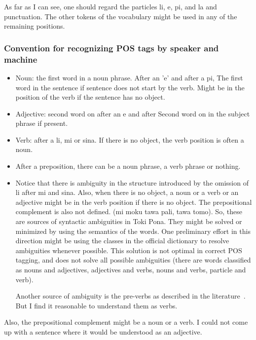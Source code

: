 \documentclass{article}
\begin{document}
As far as I can see, one should regard
the particles li, e, pi, and la
and punctuation.
The other tokens of the vocabulary
might be used in any of the remaining positions.

\subsubsection{Convention for recognizing POS tags by speaker and machine}

\begin{itemize}
  \item Noun: the first word in a noun phrase.
    After an 'e' and after a pi,
    The first word in the sentence if
    sentence does not start by the verb.
    Might be in the position of the verb
    if the sentence has no object.
  \item Adjective: second word on after an e and after
    Second word on in the subject phrase if present.
  \item Verb: after a li, mi or sina.
    If there is no object, the verb position
    is often a noun.
  \item After a preposition,
    there can be a noun phrase, a verb phrase
    or nothing.
  \item Notice that there is ambiguity in the structure
    introduced by the omission of li after mi and sina.
    Also, when there is no object, a noun or a verb
    or an adjective might be in the verb position
    if there is no object.
    The prepositional complement is also not defined.
    (mi moku tawa pali, tawa tomo).
    So, these are sources of syntactic ambiguities
    in Toki Pona.
    They might be solved or minimized by using the semantics
    of the words.
    One preliminary effort in this direction might be
    using the classes in the official dictionary to resolve
    ambiguities whenever possible.
    This solution is not optimal in correct POS tagging,
    and does not solve all possible ambiguities
    (there are words classified as nouns and adjectives,
    adjectives and verbs, nouns and verbs, particle and verb).

    Another source of ambiguity is the pre-verbs as described
    in the literature~\cite{tpLang,pije}.
    But I find it reasonable to understand them as verbs.

\end{itemize}

Also, the prepositional complement might
be a noun or a verb.
I could not come up with a sentence
where it would be understood as an adjective.
\end{document}
